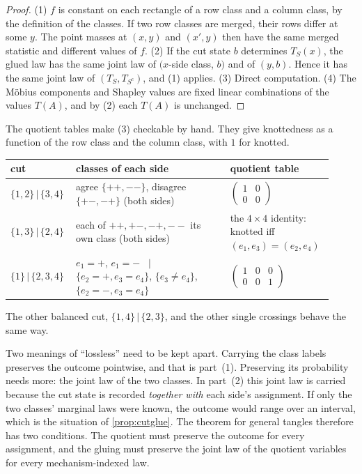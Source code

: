 \documentclass[11pt]{article}
\theoremstyle{definition}\newtheorem{definition}[theorem]{Definition}\newtheorem{remark}[theorem]{Remark}\newtheorem{example}[theorem]{Example}\newtheorem{problem}[theorem]{Open problem}\crefname{problem}{Problem}{Problems}
\begin{document}
\begin{proof}
(1) $f$ is constant on each rectangle of a row class and a column class, by the definition of the classes. If two row classes are merged, their rows differ at some $y$. The point masses at $(x,y)$ and $(x',y)$ then have the same merged statistic and different values of $f$.
(2) If the cut state $b$ determines $T_S(x)$, the glued law has the same joint law of $(x$-side class, $b)$ and of $(y,b)$. Hence it has the same joint law of $(T_S,T_{S^c})$, and (1) applies.
(3) Direct computation.
(4) The M\"obius components and Shapley values are fixed linear combinations of the values $T(A)$, and by (2) each $T(A)$ is unchanged.
\end{proof}

The quotient tables make (3) checkable by hand. They give knottedness as a function of the row class and the column class, with $1$ for knotted.
\begin{center}\small
\begin{tabular}{p{0.17\linewidth}p{0.46\linewidth}p{0.29\linewidth}}
\toprule
cut & classes of each side & quotient table\\\midrule
$\{1,2\}\,|\,\{3,4\}$ & agree $\{++,--\}$, disagree $\{+-,-+\}$ (both sides) & $\begin{pmatrix}1&0\\0&0\end{pmatrix}$\\[3pt]
$\{1,3\}\,|\,\{2,4\}$ & each of $++,+-,-+,--$ its own class (both sides) & the $4\times4$ identity: knotted iff $(e_1,e_3)=(e_2,e_4)$\\[3pt]
$\{1\}\,|\,\{2,3,4\}$ & $e_1=+$, $e_1=-$ \ $|$\ $\{e_2=+,e_3=e_4\}$, $\{e_3\ne e_4\}$, $\{e_2=-,e_3=e_4\}$ & $\begin{pmatrix}1&0&0\\0&0&1\end{pmatrix}$\\
\bottomrule
\end{tabular}
\end{center}
The other balanced cut, $\{1,4\}\,|\,\{2,3\}$, and the other single crossings behave the same way.

Two meanings of ``lossless'' need to be kept apart. Carrying the class labels preserves the outcome pointwise, and that is part~(1). Preserving its probability needs more: the joint law of the two classes. In part~(2) this joint law is carried because the cut state is recorded \emph{together with} each side's assignment. If only the two classes' marginal laws were known, the outcome would range over an interval, which is the situation of \cref{prop:cutglue}. The theorem for general tangles therefore has two conditions. The quotient must preserve the outcome for every assignment, and the gluing must preserve the joint law of the quotient variables for every mechanism-indexed law.
\end{document}
